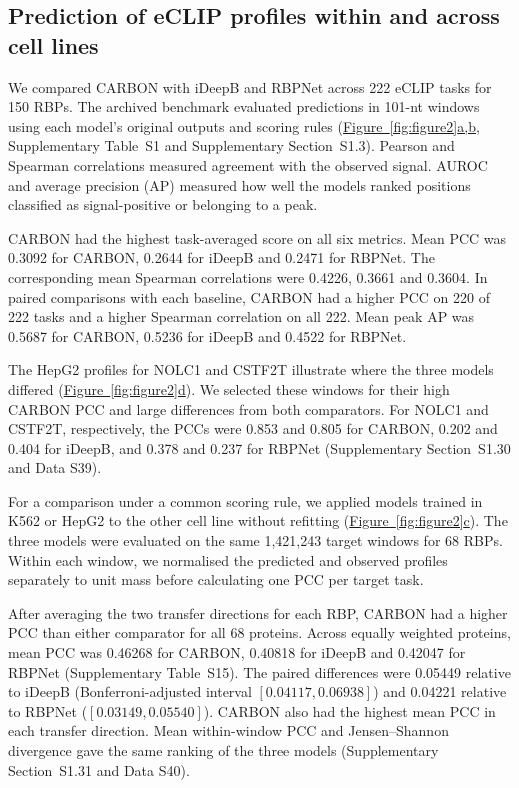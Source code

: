 \documentclass[webpdf,contemporary,large]{current_assets/oup-authoring-template}
\newcommand{\figpanelref}[2]{\hyperref[#1]{Figure~\ref*{#1}#2}}
\newcommand{\suptab}[1]{Supplementary Table~#1}
\newcommand{\supsect}[1]{Supplementary Section~#1}
\begin{document}
\subsection{Prediction of eCLIP profiles within and across cell lines}\label{subsec:benchmark}\label{subsec:ablation}\label{subsec:feature_comparison}\label{subsec:matched_results}

We compared CARBON with iDeepB and RBPNet across 222 eCLIP tasks for 150 RBPs. The archived benchmark evaluated predictions in 101-nt windows using each model's original outputs and scoring rules (\figpanelref{fig:figure2}{a,b}, \suptab{S1} and \supsect{S1.3}). Pearson and Spearman correlations measured agreement with the observed signal. AUROC and average precision (AP) measured how well the models ranked positions classified as signal-positive or belonging to a peak.

CARBON had the highest task-averaged score on all six metrics. Mean PCC was 0.3092 for CARBON, 0.2644 for iDeepB and 0.2471 for RBPNet. The corresponding mean Spearman correlations were 0.4226, 0.3661 and 0.3604. In paired comparisons with each baseline, CARBON had a higher PCC on 220 of 222 tasks and a higher Spearman correlation on all 222. Mean peak AP was 0.5687 for CARBON, 0.5236 for iDeepB and 0.4522 for RBPNet.

The HepG2 profiles for NOLC1 and CSTF2T illustrate where the three models differed (\figpanelref{fig:figure2}{d}). We selected these windows for their high CARBON PCC and large differences from both comparators. For NOLC1 and CSTF2T, respectively, the PCCs were 0.853 and 0.805 for CARBON, 0.202 and 0.404 for iDeepB, and 0.378 and 0.237 for RBPNet (\supsect{S1.30} and Data S39).

\label{subsec:transfer}

For a comparison under a common scoring rule, we applied models trained in K562 or HepG2 to the other cell line without refitting (\figpanelref{fig:figure2}{c}). The three models were evaluated on the same 1,421,243 target windows for 68 RBPs. Within each window, we normalised the predicted and observed profiles separately to unit mass before calculating one PCC per target task.

After averaging the two transfer directions for each RBP, CARBON had a higher PCC than either comparator for all 68 proteins. Across equally weighted proteins, mean PCC was 0.46268 for CARBON, 0.40818 for iDeepB and 0.42047 for RBPNet (\suptab{S15}). The paired differences were 0.05449 relative to iDeepB (Bonferroni-adjusted interval $[0.04117,0.06938]$) and 0.04221 relative to RBPNet ($[0.03149,0.05540]$). CARBON also had the highest mean PCC in each transfer direction. Mean within-window PCC and Jensen--Shannon divergence gave the same ranking of the three models (\supsect{S1.31} and Data S40).
\end{document}
